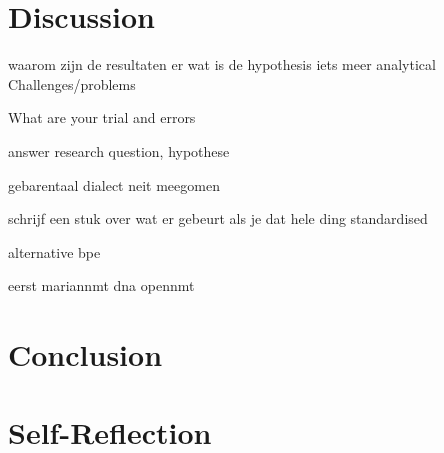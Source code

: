 \section{Discussion}
waarom zijn de resultaten er wat is de hypothesis iets meer analytical
Challenges/problems

What are your trial and errors

answer research question, hypothese

gebarentaal dialect neit meegomen

schrijf een stuk over wat er gebeurt als je dat hele ding standardised

alternative bpe

eerst mariannmt dna opennmt



\section{Conclusion}

\section{Self-Reflection}




